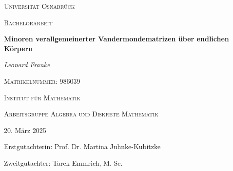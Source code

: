 \begin{titlepage}
\begin{center}
    \LARGE \textsc{Universität Osnabrück}

    \vspace{1cm}

    \Large \textsc{Bachelorarbeit}

    \vspace{1.5cm}

    \Huge \textbf{Minoren verallgemeinerter Vandermondematrizen über endlichen Körpern}

    \vspace{1.5cm}

    \Large \textit{Leonard Franke}

    \textsc{Matrikelnummer:} 986039

    \vspace{1cm}

    \textsc{Institut für Mathematik}

    \textsc{Arbeitsgruppe Algebra und Diskrete Mathematik}

    \vfill

    \normalsize 20. März 2025 

    Erstgutachterin: Prof. Dr. Martina Juhnke-Kubitzke 

    Zweitgutachter: Tarek Emmrich, M. Sc.
\end{center}
\end{titlepage}